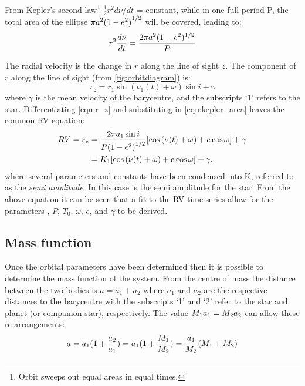 From Kepler's second law\footnote{Orbit sweeps out equal areas in equal times.} \(\frac{1}{2} r^{2} d\nu/dt\) = constant, while in one full period P, the total area of the ellipse \(\pi a^{2}{(1 - {e}^{2})}^{1/2} \) will be covered, leading to:
\begin{equation}
    r^{2} \frac{d\nu}{dt} = \frac{2\pi a^{2}(1 - {e}^{2})^{1/2}}{P} \label{eqn:kepler_area}
\end{equation}

The radial velocity is the change in \(r\) along the line of sight \(z\).
The component of \(r\) along the line of sight (from \cref{fig:orbitdiagram}) is:
\begin{equation}
    r_z =  r_1 \sin{(\nu_1(t) + \omega)}\sin{i} + \gamma \label{eqn:r_z}
\end{equation}
where \(\gamma\) is the mean velocity of the barycentre, and the subscripts `1' refers to the star.
Differentiating \cref{eqn:r_z} and substituting in \cref{eqn:kepler_area} leaves the common {RV} equation:
\begin{align}
    {RV} = \dot{r}_z &= \frac{2 \pi a_1 \sin{i}}{P{(1 - {e}^{2})}^{1/2}} [\cos{(\nu(t) + \omega)} + e\cos{\omega}] + \gamma  \label{eqn:rv_equation} \\
     &= {K}_{1} [\cos{(\nu(t) + \omega)} + e\cos{\omega}] + \gamma,
\end{align}
where several parameters and constants have been condensed into $\textrm{K}$, referred to as the \emph{semi amplitude}.
In this case \Kone{} is the semi amplitude for the star.
From the above equation it can be seen that a fit to the {RV} time series allow for the parameters \Kone{}, \(P\), \(T_0\), \(\omega\), \(e\), and \(\gamma\) to be derived.

\subsection{Mass function}
Once the orbital parameters have been determined then it is possible to determine the mass function of the system.
From the centre of mass the distance between the two bodies is \(a = a_1 + a_2\) where $a_1$ and $a_2$ are the respective distances to the barycentre with the subscripts `1' and `2' refer to the star and planet (or companion star), respectively.
The value \({M}_{1} a_1 = {M}_{2} a_2\) can allow these re-arrangements:
\begin{equation}
    a = a_{1} (1 + \frac{a_{2}}{a_{1}}) = a_{1}(1 + \frac{{M}_{1}}{{M}_{2}}) = \frac{a_{1}}{{M}_{2}} ({M}_{1} + {M}_{2})
\end{equation}

